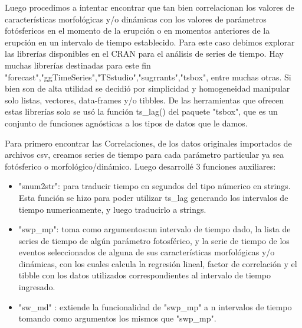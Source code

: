 \documentclass[12pt,a4paper,spanish]{article}
\begin{document}
Luego procedimos a intentar encontrar que tan bien correlacionan los valores de características morfológicas y/o dinámicas con los valores de parámetros fotósfericos en el momento de la erupción o en momentos anteriores de la erupción en un intervalo de tiempo establecido. Para este caso debimos explorar las librerías disponibles en el CRAN para el análisis de series de tiempo. Hay muchas librerías destinadas para este fin "forecast","ggTimeSeries","TSstudio","sugrrants","tsbox", entre muchas otras. Si bien son de alta utilidad se decidió por simplicidad y homogeneidad manipular solo listas, vectores, data-frames y/o tibbles. De las herramientas que ofrecen estas librerías solo se usó la función ts\_lag() del paquete "tsbox", que es un conjunto de funciones agnósticas a los tipos de datos que le damos.\par
Para primero encontrar las Correlaciones, de los datos originales importados de archivos csv, creamos series de tiempo para cada parámetro particular ya sea fotósferico o morfológico/dinámico. Luego desarrollé 3 funciones auxiliares:
\begin{itemize}
  \item "snum2str": para traducir tiempo en segundos del tipo númerico en strings. Esta función se hizo para poder utilizar ts\_lag generando los intervalos de tiempo numericamente, y luego traducirlo a strings.
  \item "swp\_mp": toma como argumentos:un intervalo de tiempo dado, la lista de series de tiempo de algún parámetro fotosférico, y la serie de tiempo de los eventos seleccionados de alguna de sus características morfológicas y/o dinámicas, con los cuales calcula la regresión lineal, factor de correlación y el tibble con los datos utilizados correspondientes al intervalo de tiempo ingresado.
  \item "sw\_md" : extiende la funcionalidad de "swp\_mp" a n intervalos de tiempo tomando como argumentos los mismos que "swp\_mp".
\end{itemize}
\end{document}
